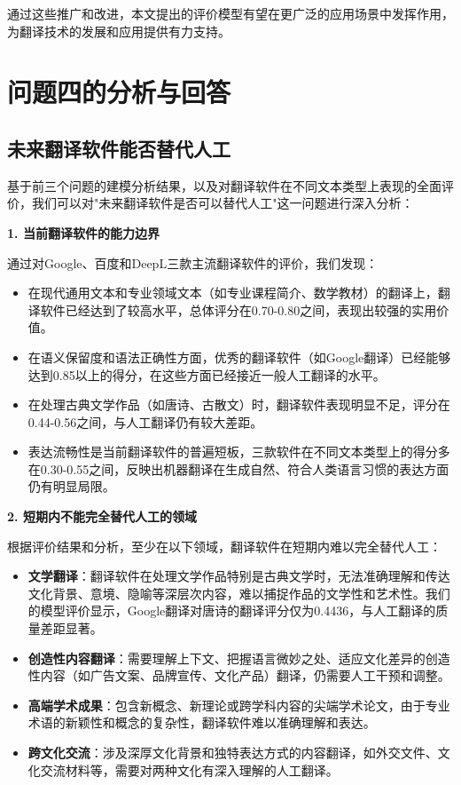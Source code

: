 \documentclass[bwprint]{cumcmthesis}
\begin{document}
通过这些推广和改进，本文提出的评价模型有望在更广泛的应用场景中发挥作用，为翻译技术的发展和应用提供有力支持。


\section{问题四的分析与回答}

\subsection{未来翻译软件能否替代人工}
基于前三个问题的建模分析结果，以及对翻译软件在不同文本类型上表现的全面评价，我们可以对"未来翻译软件是否可以替代人工"这一问题进行深入分析：

\textbf{1. 当前翻译软件的能力边界}

通过对Google、百度和DeepL三款主流翻译软件的评价，我们发现：

\begin{itemize}
    \item 在现代通用文本和专业领域文本（如专业课程简介、数学教材）的翻译上，翻译软件已经达到了较高水平，总体评分在0.70-0.80之间，表现出较强的实用价值。
    
    \item 在语义保留度和语法正确性方面，优秀的翻译软件（如Google翻译）已经能够达到0.85以上的得分，在这些方面已经接近一般人工翻译的水平。
    
    \item 在处理古典文学作品（如唐诗、古散文）时，翻译软件表现明显不足，评分在0.44-0.56之间，与人工翻译仍有较大差距。
    
    \item 表达流畅性是当前翻译软件的普遍短板，三款软件在不同文本类型上的得分多在0.30-0.55之间，反映出机器翻译在生成自然、符合人类语言习惯的表达方面仍有明显局限。
\end{itemize}

\textbf{2. 短期内不能完全替代人工的领域}

根据评价结果和分析，至少在以下领域，翻译软件在短期内难以完全替代人工：

\begin{itemize}
    \item \textbf{文学翻译}：翻译软件在处理文学作品特别是古典文学时，无法准确理解和传达文化背景、意境、隐喻等深层次内容，难以捕捉作品的文学性和艺术性。我们的模型评价显示，Google翻译对唐诗的翻译评分仅为0.4436，与人工翻译的质量差距显著。
    
    \item \textbf{创造性内容翻译}：需要理解上下文、把握语言微妙之处、适应文化差异的创造性内容（如广告文案、品牌宣传、文化产品）翻译，仍需要人工干预和调整。
    
    \item \textbf{高端学术成果}：包含新概念、新理论或跨学科内容的尖端学术论文，由于专业术语的新颖性和概念的复杂性，翻译软件难以准确理解和表达。
    
    \item \textbf{跨文化交流}：涉及深厚文化背景和独特表达方式的内容翻译，如外交文件、文化交流材料等，需要对两种文化有深入理解的人工翻译。
\end{itemize}
\end{document}

